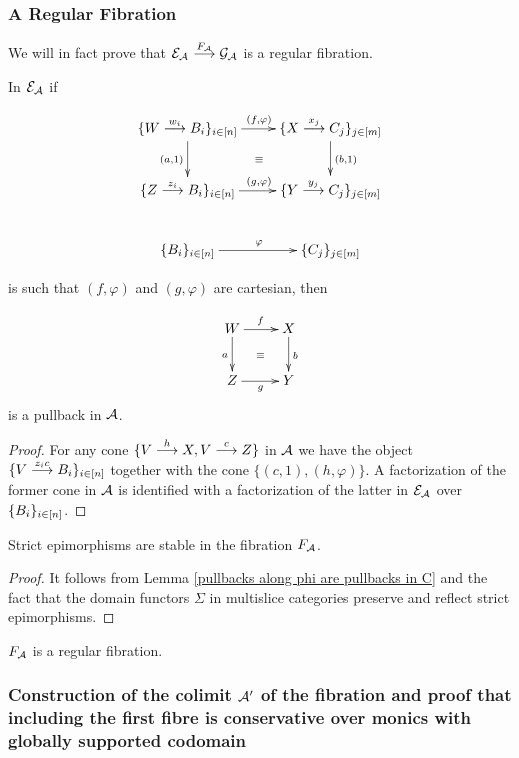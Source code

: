 \subsubsection*{A Regular Fibration}
We will in fact prove that  ${\mathcal{E}_{\mathcal{A}^{}} \overset {F_{\mathcal{A}}} {\longrightarrow} \mathcal{G}_{\mathcal{A}^{}}}$ is a regular fibration.


\begin{lemma}\label{pullbacks along phi are pullbacks in C}
In $\mathcal{E}_{\mathcal{A}^{}}$ if

\[
\xymatrix{ \{W \mr{w_i} B_i\}_{i \in [n]} \ar[r]^{(f,\varphi)} \ar[d]_{(a,1)} \ar@{}[dr]|{\equiv} & \{X \mr{x_j} C_j\}_{j \in [m]} \ar[d]^{(b,1)} \\   
           \{Z \mr{z_i} B_i\}_{i \in [n]} \ar[r]^{(g,\varphi)} & \{Y \mr{y_j} C_j\}_{j \in [m]} \\
           \Bi  \ar[r]^\varphi & \Cj
           }
\]



is such that $(f,\varphi)$ and $(g,\varphi)$ are cartesian, then

\[
\xymatrix{ W \ar[r]^f \ar[d]_a \ar@{}[dr]|{\equiv} & X  \ar[d]^b \\   
           Z \ar[r]_g & Y}
\]
is a pullback in $\mathcal{A}$.

\end{lemma}


\begin{proof}
For any cone $\{V \overset {h} {\longrightarrow} X, V \overset {c} {\longrightarrow} Z \}$ in $\mathcal{A}$ we have the object $\{V \overset {z_ic} {\longrightarrow} B_i\}_{i \in [n]}$ together with the cone $\{(c,1),(h,\varphi)\}$. A factorization of the former cone in $\mathcal{A}$ is identified with a factorization of the latter in $\mathcal{E}_{\mathcal{A}^{}}$ over $\{B_i\}_{ i \in [n]}$. 
\end{proof}

\begin{proposition}\label{trans pres epics}
Strict epimorphisms are stable in the fibration $F_{\mathcal{A}}$.
\end{proposition}

\begin{proof}
It follows from Lemma \ref{pullbacks along phi are pullbacks in C} and the fact that the domain functors $\Sigma$ in multislice categories preserve and reflect strict epimorphisms.
\end{proof}

\begin{corollary}
$F_{\mathcal{A}}$ is a regular fibration.
\end{corollary}


\subsubsection{Construction of the colimit $\mathcal{A'}$ of the fibration and proof that including the first fibre is conservative over monics with globally supported codomain}

